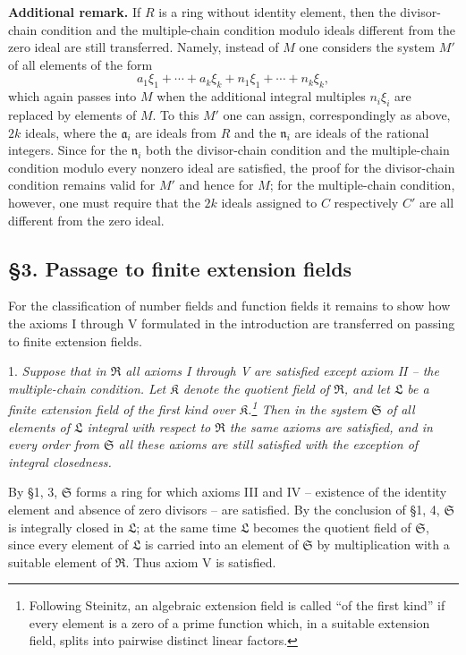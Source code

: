 \documentclass[11pt]{article}
\providecommand{\mR}{\mathfrak{R}}
\providecommand{\mK}{\mathfrak{K}}
\providecommand{\mL}{\mathfrak{L}}
\providecommand{\mS}{\mathfrak{S}}
\begin{document}
\medskip
\noindent\textbf{Additional remark.} If $R$ is a ring without identity element, then
the divisor-chain condition and the multiple-chain condition modulo ideals different
from the zero ideal are still transferred. Namely, instead of $M$ one considers the
system $M'$ of all elements of the form
\[
        a_1\xi_1+\cdots+a_k\xi_k+n_1\xi_1+\cdots+n_k\xi_k,
\]
which again passes into $M$ when the additional integral multiples $n_i\xi_i$ are
replaced by elements of $M$. To this $M'$ one can assign, correspondingly as
above, $2k$ ideals, where the $\mathfrak a_i$ are ideals from $R$ and the
$\mathfrak n_i$ are ideals of the rational integers. Since for the $\mathfrak n_i$
both the divisor-chain condition and the multiple-chain condition modulo every
nonzero ideal are satisfied, the proof for the divisor-chain condition remains valid
for $M'$ and hence for $M$; for the multiple-chain condition, however, one must
require that the $2k$ ideals assigned to $C$ respectively $C'$ are all different
from the zero ideal.

\setcounter{footnote}{13}

\subsection*{§3. Passage to finite extension fields}

For the classification of number fields and function fields it remains to show how the axioms I through V formulated in the introduction are transferred on passing to finite extension fields.

1. \emph{Suppose that in $\mR$ all axioms I through V are satisfied except axiom II -- the multiple-chain condition. Let $\mK$ denote the quotient field of $\mR$, and let $\mL$ be a finite extension field of the first kind over $\mK$.\footnote{Following Steinitz, an algebraic extension field is called ``of the first kind'' if every element is a zero of a prime function which, in a suitable extension field, splits into pairwise distinct linear factors.} Then in the system $\mS$ of all elements of $\mL$ integral with respect to $\mR$ the same axioms are satisfied, and in every order from $\mS$ all these axioms are still satisfied with the exception of integral closedness.}

By §1, 3, $\mS$ forms a ring for which axioms III and IV -- existence of the identity element and absence of zero divisors -- are satisfied. By the conclusion of §1, 4, $\mS$ is integrally closed in $\mL$; at the same time $\mL$ becomes the quotient field of $\mS$, since every element of $\mL$ is carried into an element of $\mS$ by multiplication with a suitable element of $\mR$. Thus axiom V is satisfied.
\end{document}
